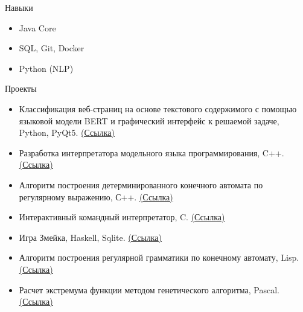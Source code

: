 \documentclass{resume} %
\begin{document}
\begin{rSection}{Навыки}
\begin{itemize}
  \item Java Core
  \item SQL, Git, Docker
  \item Python (NLP)
\end{itemize}
\end{rSection}



\begin{rSection}{Проекты}
\begin{itemize}
\item {Классификация веб-страниц на основе текстового содержимого с помощью языковой модели BERT и графический интерфейс к решаемой задаче, Python, PyQt5. \href{https://github.com/tymillnyc/diploma} {\underline {(Ссылка)}}}
\item {Разработка интерпретатора модельного языка программирования, C++. \href{https://github.com/tymillnyc/PLInterpreter} {\underline {(Ссылка)}}}
\item {Алгоритм построения детерминированного конечного автомата по регулярному выражению, С++. \href{https://github.com/tymillnyc/re2dfa} {\underline {(Ссылка)}}} 
\item {Интерактивный командный интерпретатор, C. \href{https://github.com/tymillnyc/myshell} {\underline {(Ссылка)}}} 
\item {Игра \textquotedbl{}Змейка\textquotedbl{}, Haskell, Sqlite. \href{https://github.com/tymillnyc/chervyak} {\underline {(Ссылка)}}} 
\item {Алгоритм построения регулярной грамматики по конечному автомату, Lisp. \href{https://github.com/tymillnyc/dfa2reggram} {\underline {(Ссылка)}}} 
\item {Расчет экстремума функции методом генетического алгоритма, Pascal. \href{https://github.com/tymillnyc/GeneticAlgorithm} {\underline {(Ссылка)}}} 
\end{itemize}
\end{rSection} 





\end{document}
